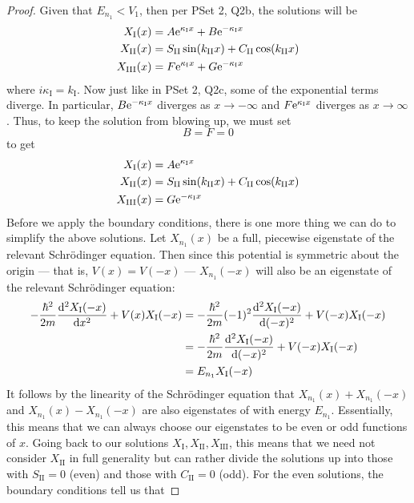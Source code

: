 \documentclass[../psets.tex]{subfiles}
\begin{document}
\begin{enumerate}
\begin{enumerate}
\begin{proof}
            Given that $E_{n_1}<V_1$, then per PSet 2, Q2b, the solutions will be
            \begin{align*}
                X_\text{I}(x) &= A\e[\kappa_\text{I}x]+B\e[-\kappa_\text{I}x]\\
                X_\text{II}(x) &= S_\text{II}\sin(k_\text{II}x)+C_\text{II}\cos(k_\text{II}x)\\
                X_\text{III}(x) &= F\e[\kappa_\text{I}x]+G\e[-\kappa_\text{I}x]
            \end{align*}
            where $i\kappa_\text{I}=k_\text{I}$. Now just like in PSet 2, Q2c, some of the exponential terms diverge. In particular, $B\e[-\kappa_\text{I}x]$ diverges as $x\to -\infty$ and $F\e[\kappa_\text{I}x]$ diverges as $x\to\infty$. Thus, to keep the solution from blowing up, we must set
            \begin{equation*}
                B = F = 0
            \end{equation*}
            to get
            \begin{align*}
                X_\text{I}(x) &= A\e[\kappa_\text{I}x]\\
                X_\text{II}(x) &= S_\text{II}\sin(k_\text{II}x)+C_\text{II}\cos(k_\text{II}x)\\
                X_\text{III}(x) &= G\e[-\kappa_\text{I}x]
            \end{align*}
            Before we apply the boundary conditions, there is one more thing we can do to simplify the above solutions. Let $X_{n_1}(x)$ be a full, piecewise eigenstate of the relevant Schr\"{o}dinger equation. Then since this potential is symmetric about the origin --- that is, $V(x)=V(-x)$ --- $X_{n_1}(-x)$ will also be an eigenstate of the relevant Schr\"{o}dinger equation:
            \begin{align*}
                -\frac{\hbar^2}{2m}\dv[2]{X_\text{I}(-x)}{x}+V(x)X_\text{I}(-x) &= -\frac{\hbar^2}{2m}(-1)^2\dv[2]{X_\text{I}(-x)}{(-x)}+V(-x)X_\text{I}(-x)\\
                &= -\frac{\hbar^2}{2m}\dv[2]{X_\text{I}(-x)}{(-x)}+V(-x)X_\text{I}(-x)\\
                &= E_{n_1}X_\text{I}(-x)
            \end{align*}
            It follows by the linearity of the Schr\"{o}dinger equation that $X_{n_1}(x)+X_{n_1}(-x)$ and $X_{n_1}(x)-X_{n_1}(-x)$ are also eigenstates of with energy $E_{n_1}$. Essentially, this means that we can always choose our eigenstates to be even or odd functions of $x$. Going back to our solutions $X_\text{I},X_\text{II},X_\text{III}$, this means that we need not consider $X_\text{II}$ in full generality but can rather divide the solutions up into those with $S_\text{II}=0$ (even) and those with $C_\text{II}=0$ (odd). For the even solutions, the boundary conditions tell us that

\end{proof}
\end{enumerate}
\end{enumerate}
\end{document}
